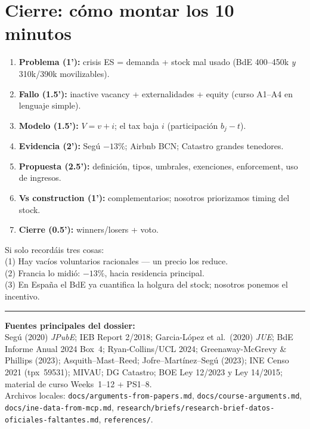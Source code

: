 \documentclass[11pt,a4paper]{report}
\begin{document}
\chapter{Cierre: c\'omo montar los 10 minutos}
\label{ch:cierre}

\begin{intuicion}[title={Estructura sugerida de la presentaci\'on}]
\begin{enumerate}
  \item \textbf{Problema (1'):} crisis ES = demanda + stock mal usado (BdE 400--450k
        \emph{y} 310k/390k movilizables).
  \item \textbf{Fallo (1.5'):} inactive vacancy + externalidades + equity
        (curso A1--A4 en lenguaje simple).
  \item \textbf{Modelo (1.5'):} $V=v+i$; el tax baja $i$ (participaci\'on $b_j-t$).
  \item \textbf{Evidencia (2'):} Seg\'u $-13\%$; Airbnb BCN; Catastro grandes tenedores.
  \item \textbf{Propuesta (2.5'):} definici\'on, tipos, umbrales, exenciones,
        enforcement, uso de ingresos.
  \item \textbf{Vs construction (1'):} complementarios; nosotros priorizamos timing del stock.
  \item \textbf{Cierre (0.5'):} winners/losers + voto.
\end{enumerate}
\end{intuicion}

\begin{resumenbox}
Si solo record\'ais tres cosas:\\[0.4em]
(1) Hay vac\'ios voluntarios racionales --- un precio los reduce.\\
(2) Francia lo midió: $-13\%$, hacia residencia principal.\\
(3) En Espa\~na el BdE ya cuantifica la holgura del stock; nosotros ponemos el incentivo.
\end{resumenbox}

\vspace{1.2cm}
{\color{azulmedio}\rule{\textwidth}{1pt}}

\vspace{0.6cm}
\noindent\small\color{azuloscuro}
\textbf{Fuentes principales del dossier:}\\[0.3em]
Seg\'u (2020) \emph{JPubE}; IEB Report 2/2018; Garcia-L\'opez et al.\ (2020) \emph{JUE};
BdE Informe Anual 2024 Box~4; Ryan-Collins/UCL 2024; Greenaway-McGrevy \& Phillips (2023);
Asquith--Mast--Reed; Jofre--Mart\'inez--Seg\'u (2023); INE Censo 2021 (tpx~59531);
MIVAU; DG Catastro; BOE Ley 12/2023 y Ley 14/2015; material de curso Weeks~1--12 + PS1--8.\\[0.5em]
Archivos locales: \texttt{docs/arguments-from-papers.md}, \texttt{docs/course-arguments.md},
\texttt{docs/ine-data-from-mcp.md}, \texttt{research/briefs/research-brief-datos-oficiales-faltantes.md},
\texttt{references/}.
\end{document}
